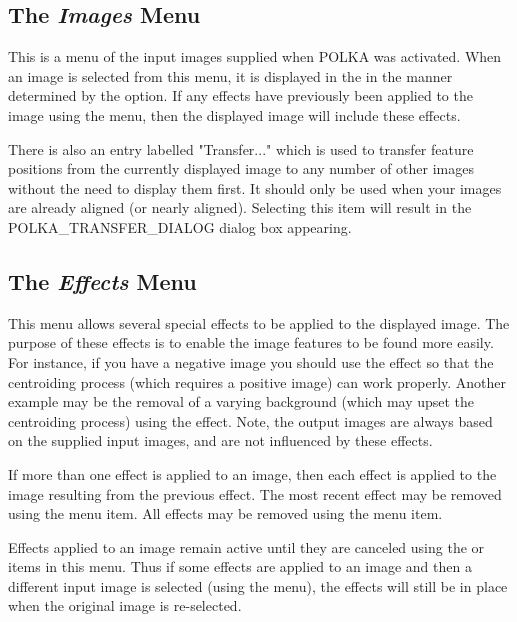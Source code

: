 \documentclass[11pt,nolof]{starlink}
\providecommand{\mylabel}[1] {\xlabel{#1}\label{#1}}
\begin{document}
\subsection {\mylabel{POLKA_IMAGES_MENU}The \emph{Images} Menu}
This is a menu of the input images supplied when POLKA was
activated. When an image is selected from this menu, it is displayed in
the  in the manner
determined by the  option. If any
effects have previously been applied to the image using the  menu, then the displayed image will
include these effects.

There is also an entry labelled "Transfer..." which is used to transfer
feature positions from the currently displayed image to any number of
other images without the need to display them first. It should only be
used when your images are already aligned (or nearly aligned). Selecting
this item will result in the 
{POLKA_TRANSFER_DIALOG} dialog box appearing.

\subsection {\mylabel{POLKA_EFFECTS_MENU}The \emph{Effects} Menu}
This menu allows several special effects to be applied to the displayed
image. The purpose of these effects is to enable the image features to be
found more easily. For instance, if you have a negative image you should
use the  effect so that the
centroiding process (which requires a positive image) can work properly.
Another example may be the removal of a varying background (which may upset
the centroiding process) using the
 effect. Note, the output
images are always based on the supplied input images, and are not
influenced by these effects.

If more than one effect is applied to an image, then each effect is
applied to the image resulting from the previous effect. The most recent
effect may be removed using the 
menu item. All effects may be removed using the  menu item.

Effects applied to an image remain active until they are canceled using
the  or
 items in this menu. Thus
if some effects are applied to an image and then a different input image
is selected (using the  menu),
the effects will still be in place when the original image is re-selected.
\end{document}
